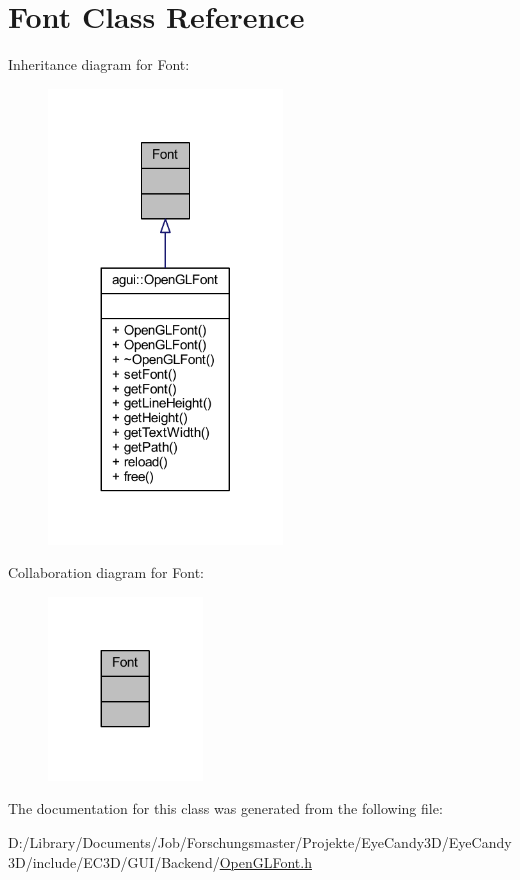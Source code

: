 \hypertarget{class_font}{}\section{Font Class Reference}
\label{class_font}


Inheritance diagram for Font\+:\nopagebreak
\begin{figure}[H]
\begin{center}
\leavevmode
\includegraphics[width=176pt]{class_font__inherit__graph}
\end{center}
\end{figure}


Collaboration diagram for Font\+:\nopagebreak
\begin{figure}[H]
\begin{center}
\leavevmode
\includegraphics[width=116pt]{class_font__coll__graph}
\end{center}
\end{figure}


The documentation for this class was generated from the following file\+:\begin{DoxyCompactItemize}
\item 
D\+:/\+Library/\+Documents/\+Job/\+Forschungsmaster/\+Projekte/\+Eye\+Candy3\+D/\+Eye\+Candy3\+D/include/\+E\+C3\+D/\+G\+U\+I/\+Backend/\mbox{\hyperlink{_open_g_l_font_8h}{Open\+G\+L\+Font.\+h}}\end{DoxyCompactItemize}
